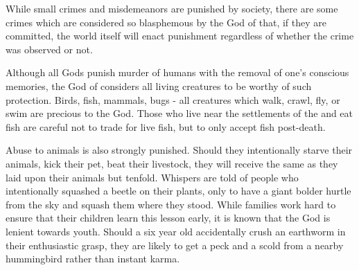 \documentclass[blue]{GL2020}
\begin{document}
While small crimes and misdemeanors are punished by society, there are some crimes which are considered so blasphemous by the God of \pFarm{} that, if they are committed, the world itself will enact punishment regardless of whether the crime was observed or not.

Although all Gods punish murder of humans with the removal of one's conscious memories, the God of \pFarm{} considers all living creatures to be worthy of such protection.  Birds, fish, mammals, bugs - all creatures which walk, crawl, fly, or swim are precious to the God.  Those \pFarm{} who live near the settlements of the \pShip{} and eat fish are careful not to trade for live fish, but to only accept fish post-death.

Abuse to animals is also strongly punished.  Should they intentionally starve their animals, kick their pet, beat their livestock, they will receive the same as they laid upon their animals but tenfold.  Whispers are told of people who intentionally squashed a beetle on their plants, only to have a giant bolder hurtle from the sky and squash them where they stood.  While families work hard to ensure that their children learn this lesson early, it is known that the God is lenient towards youth.  Should a six year old accidentally crush an earthworm in their enthusiastic grasp, they are likely to get a peck and a scold from a nearby hummingbird rather than instant karma. 
\end{document}
